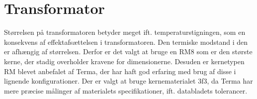 \section{Transformator} \label{Transana}
Størrelsen på transformatoren betyder meget ift. temperaturstigningen, som en konsekvens af effektafsættelsen i transformatoren. Den termiske modstand i den er afhængig af størrelsen\cite{epcos-cores}. Derfor er det valgt at bruge en RM8\cite{RM8} som er den største kerne, der stadig overholder kravene for dimensionerne. Desuden er kernetypen RM blevet anbefalet af Terma, der har haft god erfaring med brug af disse i lignende konfigurationer. Der er valgt at bruge kernematerialet 3f3\cite{3f3}, da Terma har mere præcise målinger af materialets specifikationer, ift. databladets tolerancer.

